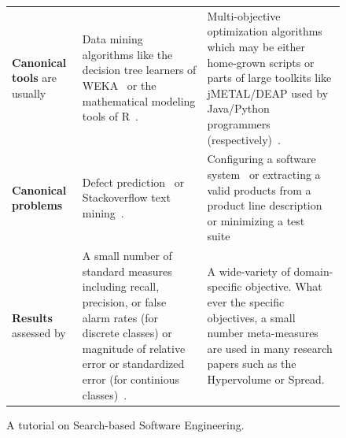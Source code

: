 \documentclass[table, xcdraw, sigconf,review, anonymous]{acmart}
\begin{document}
\begin{figure}
{\begin{tabular}{@{}p{3cm}p{6cm}p{8.35cm}@{}}
 \rowcolor{gray!40}\textbf{Canonical   tools} are usually
&
Data mining algorithms like  the decision
tree learners of WEKA~\cite{hall2009weka} or the mathematical modeling tools of R~\cite{rmanual18}.
&
Multi-objective optimization algorithms which may be either home-grown scripts or parts of large toolkits like jMETAL/DEAP used by Java/Python programmers (respectively)~\cite{refs2jmetalDEE, DEAP_JMLR2012}.
\\ 
\textbf{Canonical   problems}
&
Defect prediction~\cite{lessmann2008benchmarking}   or Stackoverflow text mining~\cite{fu2017easy}. 
&
Configuring a software system~\cite{nair2017faster} or extracting a valid products from a product line description~\cite{sayyad13b} or minimizing a test suite~\cite{fraser2007redundancy}
\\ 

 \rowcolor{gray!40} \textbf{Results}   assessed by
&
A small number of standard measures
including   recall, precision, or false alarm rates (for discrete classes)
or magnitude of relative error or standardized error (for continious classes)~\cite{Shepperd2012}.
&
A wide-variety of domain-specific objective.
What ever the specific objectives, a small number meta-measures are used in many research papers such as the Hypervolume or Spread. 
\end{tabular}}
\caption{A tutorial on Search-based Software Engineering.}
\label{fig:sbse_crash}
\end{figure}
 
\end{document}
